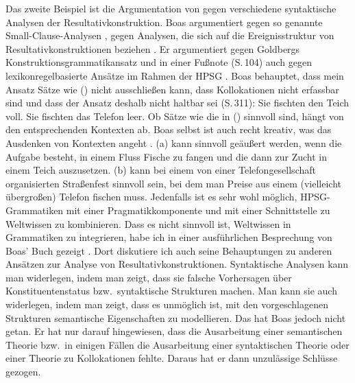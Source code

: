 Das zweite Beispiel ist die Argumentation von \citet{Boas2003a} gegen verschiedene syntaktische
Analysen der Resultativkonstruktion. Boas argumentiert gegen so genannte Small-Clause-Analysen
\citep{Hoekstra88a}, gegen Analysen, die sich auf die Ereignisstruktur von Resultativkonstruktionen
beziehen \citep{Tenny94a-u,Winkler97a,RHL98a-u,RHL2001a-u}. Er argumentiert gegen Goldbergs
Konstruktionsgrammatikansatz \citep{Goldberg95a} und in einer Fußnote (S.\,104) auch gegen
lexikonregelbasierte Ansätze im Rahmen der HPSG \parencites{Verspoor97a}{Wechsler97a}{Mueller2002b}.
Boas behauptet, dass mein Ansatz Sätze wie () nicht ausschließen kann, dass Kollokationen
nicht erfassbar sind und dass der Ansatz deshalb nicht haltbar sei (S.\,311):
\eal
\ex Sie fischten den Teich voll.
\ex Sie fischten das Telefon leer.
\zl
Ob Sätze wie die in () sinnvoll sind, hängt von den entsprechenden Kontexten ab. Boas selbst
ist auch recht kreativ, was das Ausdenken von Kontexten angeht \citep[664]{Mueller2005a}. (a)
kann sinnvoll geäußert werden, wenn die Aufgabe besteht, in einem Fluss Fische zu fangen und die
dann zur Zucht in einem Teich auszusetzen. (b) kann bei einem von einer
Telefongesellschaft organisierten Straßenfest sinnvoll sein, bei dem man Preise aus einem (vielleicht
übergroßen) Telefon fischen muss. Jedenfalls ist es sehr wohl möglich,
HPSG-Grammatiken mit einer Pragmatikkomponente und mit einer Schnittstelle zu Weltwissen zu
kombinieren. Dass es nicht sinnvoll ist, Weltwissen in Grammatiken zu integrieren, habe ich in einer
ausführlichen Besprechung von Boas' Buch gezeigt \citep[Abschnitt~3]{Mueller2005a}. Dort diskutiere ich auch seine
Behauptungen zu anderen Ansätzen zur Analyse von Resultativkonstruktionen. Syntaktische Analysen
kann man widerlegen, indem man zeigt, dass sie falsche Vorhersagen über Konstituentenstatus bzw.\
syntaktische Strukturen machen. Man kann sie auch widerlegen, indem man zeigt, dass es unmöglich
ist, mit den vorgeschlagenen Strukturen semantische Eigenschaften zu modellieren. Das hat Boas
jedoch nicht getan. Er hat nur darauf hingewiesen, dass die Ausarbeitung einer semantischen Theorie
bzw.\ in einigen Fällen die Ausarbeitung einer syntaktischen Theorie oder einer Theorie zu
Kollokationen fehlte. Daraus hat er dann unzulässige Schlüsse gezogen.






\label{lastpage}
